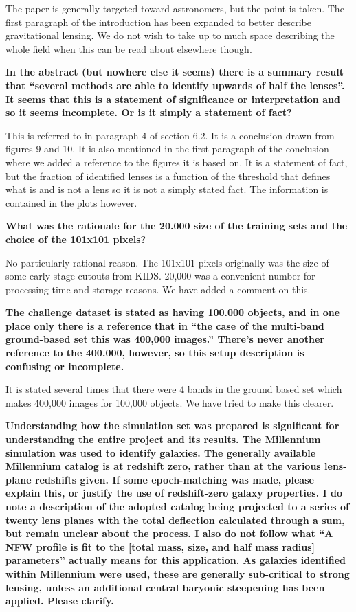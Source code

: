 \documentclass[11pt,a4paper]{article}
\begin{document}
The paper is generally targeted toward astronomers, but the point is taken.  The first paragraph of the introduction has been expanded to better describe gravitational lensing.  We do not wish to take up to much space describing the whole field when this can be read about elsewhere though.

{\bf
In the abstract (but nowhere else it seems) there is a summary result that “several methods are able to identify upwards of half the lenses”.  It seems that this is a statement of significance or interpretation and so it seems incomplete.  Or is it simply a statement of fact? 
}

This is referred to in paragraph 4 of section 6.2.  It is a conclusion drawn from figures 9 and 10.  It is also mentioned in the first paragraph of the conclusion where we added a reference to the figures it is based on.  It is a statement of fact, but the fraction of identified lenses is a function of the threshold that defines what is and is not a lens so it is not a simply stated fact.  The information is contained in the plots however.

{\bf
What was the rationale for the 20.000 size of the training sets and the choice of the 101x101 pixels? 
}

No particularly rational reason.  The 101x101 pixels originally was the size of some early stage cutouts from KIDS.  20,000 was a convenient number for processing time and storage reasons.  We have added a comment on this.

{\bf
The challenge dataset is stated as having 100.000 objects, and in one place only there is a reference that in “the case of the multi-band ground-based set this was 400,000 images.”  There’s never another reference to the 400.000, however, so this setup description is confusing or incomplete. 
}

It is stated several times that there were 4 bands in the ground based set which makes 400,000 images for 100,000 objects.  We have tried to make this clearer.

{\bf
Understanding how the simulation set was prepared is significant for understanding the entire project and its results.  The Millennium simulation was used to identify galaxies.  The generally available Millennium catalog is at redshift zero, rather than at the various lens-plane redshifts given.  If some epoch-matching was made, please explain this, or justify the use of redshift-zero galaxy properties.  I do note a description of the adopted catalog being projected to a series of twenty lens planes with the total deflection calculated through a sum, but remain unclear about the process.  I also do not follow what “A NFW profile is fit to the [total mass, size, and half mass radius] parameters” actually means for this application.  As galaxies identified within Millennium were used, these are generally sub-critical to strong lensing, unless an additional central baryonic steepening has been applied. Please clarify.  
}
\end{document}
